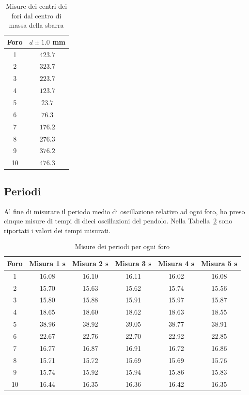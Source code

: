 \documentclass[a4paper,12pt]{article}
\begin{document}
\begin{table}[h!]
\centering
\begin{tabular}{c c}
    \toprule 
    Foro & $d \pm 1.0$ mm\\
    \midrule
    1 & $423.7$ \\
    2 & $323.7$ \\
    3 & $223.7$ \\
    4 & $123.7$ \\
    5 & $23.7$ \\
    6 & $76.3$ \\
    7 & $176.2$ \\
    8 & $276.3$ \\
    9 & $376.2$ \\
    10 & $476.3$ \\
    \bottomrule
\end{tabular}
\caption{Misure dei centri dei fori dal centro di massa della sbarra}%
\label{tab:d}
\end{table}

\subsection{Periodi}

Al fine di misurare il periodo medio di oscillazione relativo ad ogni foro, ho preso cinque misure di tempi di dieci oscillazioni del pendolo. 
Nella Tabella~\ref{tab:periodi} sono riportati i valori dei tempi misurati.

\begin{table}[h!]
\centering
\begin{tabular}{c|c c c c c}
    \toprule 
    Foro & Misura 1 s & Misura 2 s & Misura 3 s & Misura 4 s & Misura 5 s\\
    \midrule
    1 &  16.08& 16.10 & 16.11 & 16.02 & 16.08  \\
    2 &  15.70& 15.63& 15.62& 15.74& 15.56  \\
    3 &  15.80& 15.88& 15.91& 15.97& 15.87  \\
    4 &  18.65& 18.60& 18.62& 18.63& 18.55  \\
    5 &  38.96& 38.92& 39.05& 38.77& 38.91  \\
    6 &  22.67& 22.76& 22.70& 22.92& 22.85  \\
    7 &  16.77& 16.87& 16.91& 16.72& 16.86  \\
    8 &  15.71& 15.72& 15.69& 15.69& 15.76  \\
    9 &  15.74& 15.92& 15.94& 15.86& 15.83  \\
    10 & 16.44& 16.35& 16.36& 16.42& 16.35 \\

    \bottomrule
\end{tabular}
\caption{Misure dei periodi per ogni foro}%
\label{tab:periodi}
\end{table}
\end{document}
